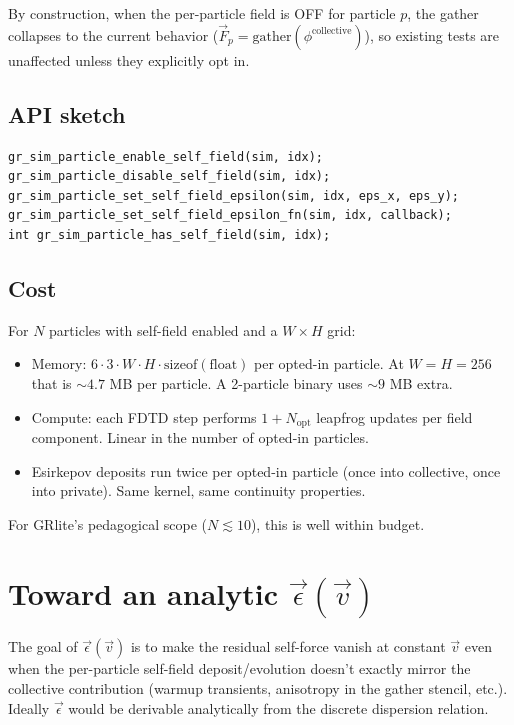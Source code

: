 \documentclass[11pt,a4paper]{article}
\begin{document}
By construction, when the per-particle field is OFF for particle $p$,
the gather collapses to the current behavior ($\vec F_p =
\mathrm{gather}(\phi^{\mathrm{collective}})$), so existing tests are
unaffected unless they explicitly opt in.

\subsection{API sketch}

\begin{verbatim}
gr_sim_particle_enable_self_field(sim, idx);
gr_sim_particle_disable_self_field(sim, idx);
gr_sim_particle_set_self_field_epsilon(sim, idx, eps_x, eps_y);
gr_sim_particle_set_self_field_epsilon_fn(sim, idx, callback);
int gr_sim_particle_has_self_field(sim, idx);
\end{verbatim}

\subsection{Cost}

For $N$ particles with self-field enabled and a $W \times H$ grid:
\begin{itemize}
  \item Memory: $6 \cdot 3 \cdot W \cdot H \cdot \mathrm{sizeof(float)}$
    per opted-in particle.  At $W = H = 256$ that is $\sim 4.7$ MB
    per particle.  A 2-particle binary uses $\sim 9$ MB extra.
  \item Compute: each FDTD step performs $1 + N_{\mathrm{opt}}$
    leapfrog updates per field component.  Linear in the number of
    opted-in particles.
  \item Esirkepov deposits run twice per opted-in particle (once into
    collective, once into private).  Same kernel, same continuity
    properties.
\end{itemize}

For GRlite's pedagogical scope ($N \lesssim 10$), this is well
within budget.

\section{Toward an analytic $\vec\epsilon(\vec v)$}
\label{sec:derivation}

The goal of $\vec\epsilon(\vec v)$ is to make the residual
self-force vanish at constant $\vec v$ even when the
per-particle self-field deposit/evolution doesn't exactly mirror
the collective contribution (warmup transients, anisotropy in the
gather stencil, etc.).  Ideally $\vec\epsilon$ would be derivable
analytically from the discrete dispersion relation.
\end{document}
